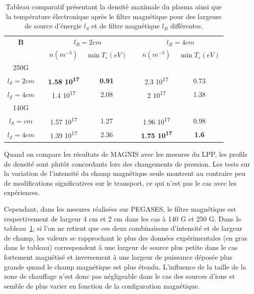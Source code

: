 \begin{refsection}
\begin{table}
\footnotesize\centering
{}
\begin{tabular}{@{}ccccccc@{}}\toprule
\bfseries B&&\multicolumn{2}{c}{$l_B=2cm$} && \multicolumn{2}{c}{$l_B=4cm$}\\
\cmidrule{3-4} \cmidrule{6-7}
&& $n (m^{-3})$ & $\min T_e (eV)$ && $n (m^{-3})$ & $\min T_e (eV)$\\
\midrule 
250G\\
\scriptsize $l_\mathcal{S}=2cm$ &&\bfseries\scriptsize 1.58
10\textsuperscript{17}&\bfseries\scriptsize 0.91&&\scriptsize 2.3
10\textsuperscript{17}&\scriptsize 0.73
\\
\scriptsize $l_\mathcal{S}=4cm$  &&\scriptsize 1.4 10\textsuperscript{17}
&\scriptsize 2.08&&\scriptsize 2 10\textsuperscript{17}&\scriptsize 1.38\\
140G\\
\scriptsize $l_\mathcal{S}=cm$ &&\scriptsize 1.57 10\textsuperscript{17}
&\scriptsize 1.27&&\scriptsize 1.96 10\textsuperscript{17}&\scriptsize 0.98 \\
\scriptsize $l_\mathcal{S}=4cm$  &&\scriptsize 1.39 10\textsuperscript{17}
&\scriptsize 2.36&&\bfseries\scriptsize 1.75 10\textsuperscript{17}&\bfseries\scriptsize
1.6\\
\bottomrule
\end{tabular}
\caption{Tableau comparatif présentant la densité maximale du plasma ainsi que
la température électronique après le filtre magnétique pour des largeurs de
source d'énergie $l_S$ et de filtre magnétique $l_B$ différentes.}
\label{4-pegasesCompLargeurs}
\end{table}

Quand on compare les résultats de MAGNIS avec les mesures du LPP, les 
profils de densité sont plutôt concordants lors des changements de pression. Les
tests sur la variation de l'intensité du champ magnétique seule montrent
au contraire peu de modifications significatives sur le transport, ce qui n'est
pas le cas avec les expériences.

Cependant, dans les mesures réalisées sur PEGASES, le filtre magnétique est
respectivement de largeur 4 cm et 2 cm dans les cas à 140 G et 250 G. Dans le
tableau~\ref{4-pegasesCompLargeurs}, si l'on ne retient que ces deux
combinaisons d'intensité et de largeur de champ, les valeurs se rapprochant le
plus des données expérimentales (en gras dans le tableau) correspondent à
une largeur de source plus petite dans le cas fortement magnétisé et
inversement à une largeur de puissance déposée plus grande quand le champ
magnétique est plus étendu. L'influence de la taille de la zone de chauffage
n'est donc pas négligeable dans le cas des sources d'ions et semble de plus
varier en fonction de la configuration magnétique.


\end{refsection}
